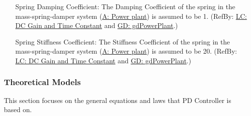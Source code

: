 \documentclass[12pt]{article}
\begin{document}
\begin{itemize}
\item[Spring Damping Coefficient:\phantomsection\label{dampingCoeffSpring}]{The Damping Coefficient of the spring in the mass-spring-damper system (\hyperref[pwrPlant]{A: Power plant}) is assumed to be 1. (RefBy: \hyperref[likeChgPP]{LC: DC Gain and Time Constant} and \hyperref[GD:gdPowerPlant]{GD: gdPowerPlant}.)}
\item[Spring Stiffness Coefficient:\phantomsection\label{stiffnessCoeffSpring}]{The Stiffness Coefficient of the spring in the mass-spring-damper system (\hyperref[pwrPlant]{A: Power plant}) is assumed to be 20. (RefBy: \hyperref[likeChgPP]{LC: DC Gain and Time Constant} and \hyperref[GD:gdPowerPlant]{GD: gdPowerPlant}.)}
\end{itemize}
\subsubsection{Theoretical Models}
\label{Sec:TMs}
This section focuses on the general equations and laws that PD Controller is based on.
\end{document}
